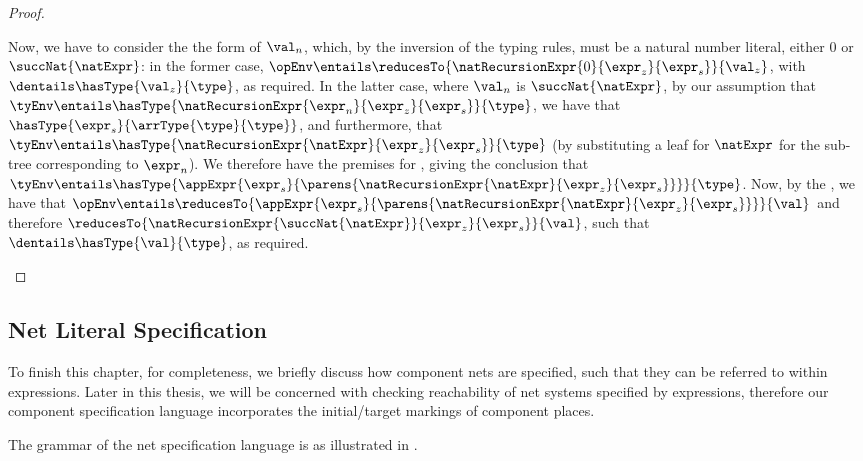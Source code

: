 \begin{proof}
\begin{itemize}
            Now, we have to consider the the form of $\val_n$, which, by the
            inversion of the typing rules, must be a natural number literal,
            either $0$ or $\succNat{\natExpr}$:
            in the former case, $\opEnv \entails
            \reducesTo{\natRecursionExpr{0}{\expr_z}{\expr_s}}{\val_z}$, with
            $\dentails \hasType{\val_z}{\type}$, as required.
            In the latter case, where $\val_n$ is $\succNat{\natExpr}$, by our
            assumption that $\tyEnv \entails
            \hasType{\natRecursionExpr{\expr_n}{\expr_z}{\expr_s}}{\type}$, we
            have that $\hasType{\expr_s}{\arrType{\type}{\type}}$, and
            furthermore, that $\tyEnv \entails
            \hasType{\natRecursionExpr{\natExpr}{\expr_z}{\expr_s}}{\type}$ (by
            substituting a leaf for $\natExpr$ for the sub-tree corresponding
            to $\expr_n$). We therefore have the premises for
            \inferenceRule{\appTyRuleName}, giving the conclusion that
            $\tyEnv \entails \hasType{\appExpr{\expr_s}
                {\parens{\natRecursionExpr {\natExpr} {\expr_z}{\expr_s}}}}
                {\type}$.
            Now, by the \IH{}, we have that $\opEnv \entails
            \reducesTo{\appExpr{\expr_s}
                {\parens{\natRecursionExpr{\natExpr}{\expr_z}{\expr_s}}}}{\val}$
            and therefore
            $\reducesTo{\natRecursionExpr{\succNat{\natExpr}}{\expr_z}{\expr_s}}{\val}$,
            such that $\dentails \hasType{\val}{\type}$, as required.
    \end{itemize}
\end{proof}

\subsection{Net Literal Specification}
\label{sec:netliteralspec}

To finish this chapter, for completeness, we briefly discuss how component nets
are specified, such that they can be referred to within \DSL{} expressions.
Later in this thesis, we will be concerned with checking reachability of net
systems specified by \DSL{} expressions, therefore our component specification
language incorporates the initial/target markings of component places.

The grammar of the net specification language is as illustrated in
.


